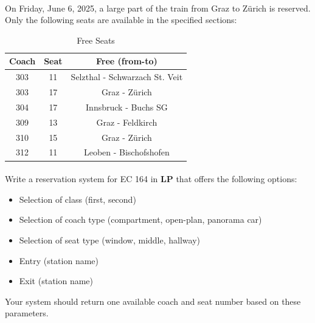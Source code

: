 \documentclass[10pt, a4paper]{article}
\begin{document}
\paragraph{}
On Friday, June 6, 2025, a large part of the train from Graz to Zürich is reserved. Only the following seats are available in the specified sections: 
\begin{table}[h]
    \centering
    \begin{tabular}{c|c|c}
         Coach & Seat & Free (from-to) \\ \hline\hline
         303 & 11 & Selzthal - Schwarzach St. Veit\\
         303 & 17 & Graz - Zürich\\ 
         304 & 17 & Innsbruck - Buchs SG\\
         309 & 13 & Graz - Feldkirch\\ 
         310 & 15 & Graz - Zürich\\ 
         312 & 11 & Leoben - Bischofshofen\\
    \end{tabular}
    \caption{Free Seats}
    \label{tab:my_label}
\end{table}
\paragraph{}
Write a reservation system for EC 164 in \textbf{LP} that offers the following options:
\begin{itemize}
    \item Selection of class (first, second)
    \item Selection of coach type (compartment, open-plan, panorama car)
    \item Selection of seat type (window, middle, hallway)
    \item Entry (station name)
    \item Exit (station name)
\end{itemize}
Your system should return one available coach and seat number based on these parameters.
\end{document}
